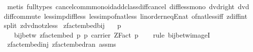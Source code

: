 \begin{isabellebody}
\ {\isacharparenleft}{\kern0pt}metis\ {\isacharparenleft}{\kern0pt}full{\isacharunderscore}{\kern0pt}types{\isacharparenright}{\kern0pt}\ cancel{\isacharunderscore}{\kern0pt}comm{\isacharunderscore}{\kern0pt}monoid{\isacharunderscore}{\kern0pt}add{\isacharunderscore}{\kern0pt}class{\isachardot}{\kern0pt}diff{\isacharunderscore}{\kern0pt}cancel\ diff{\isacharunderscore}{\kern0pt}less{\isacharunderscore}{\kern0pt}mono{}\ dvd{\isacharunderscore}{\kern0pt}{}{\isacharunderscore}{\kern0pt}right\ dvd{\isacharunderscore}{\kern0pt}diff{\isacharunderscore}{\kern0pt}commute\ less{\isacharunderscore}{\kern0pt}imp{\isacharunderscore}{\kern0pt}diff{\isacharunderscore}{\kern0pt}less\ less{\isacharunderscore}{\kern0pt}imp{\isacharunderscore}{\kern0pt}of{\isacharunderscore}{\kern0pt}nat{\isacharunderscore}{\kern0pt}less\ linorder{\isacharunderscore}{\kern0pt}neqE{\isacharunderscore}{\kern0pt}nat\ of{\isacharunderscore}{\kern0pt}nat{\isacharunderscore}{\kern0pt}{}{\isacharunderscore}{\kern0pt}less{\isacharunderscore}{\kern0pt}iff\ zdiff{\isacharunderscore}{\kern0pt}int{\isacharunderscore}{\kern0pt}split\ zdvd{\isacharunderscore}{\kern0pt}not{\isacharunderscore}{\kern0pt}zless{\isacharparenright}{\kern0pt}\isanewline
{}\isamarkupfalse%
%
\endisatagproof
{\isafoldproof}%
%
\isadelimproof
\isanewline
%
\endisadelimproof
\isanewline
{}\isamarkupfalse%
\ zfact{\isacharunderscore}{\kern0pt}embed{\isacharunderscore}{\kern0pt}bij{\isacharcolon}{\kern0pt}\isanewline
\ \ \ {\isachardoublequoteopen}p\ {\isachargreater}{\kern0pt}\ {}{\isachardoublequoteclose}\isanewline
\ \ \ {\isachardoublequoteopen}bij{\isacharunderscore}{\kern0pt}betw\ {\isacharparenleft}{\kern0pt}zfact{\isacharunderscore}{\kern0pt}embed\ p{\isacharparenright}{\kern0pt}\ {\isacharbraceleft}{\kern0pt}{}{\isachardot}{\kern0pt}{\isachardot}{\kern0pt}{\isacharless}{\kern0pt}p{\isacharbraceright}{\kern0pt}\ {\isacharparenleft}{\kern0pt}carrier\ {\isacharparenleft}{\kern0pt}ZFact\ p{\isacharparenright}{\kern0pt}{\isacharparenright}{\kern0pt}{\isachardoublequoteclose}\isanewline
%
\isadelimproof
\ \ %
\endisadelimproof
%
\isatagproof
{}\isamarkupfalse%
\ {\isacharparenleft}{\kern0pt}rule\ bij{\isacharunderscore}{\kern0pt}betw{\isacharunderscore}{\kern0pt}imageI{\isacharparenright}{\kern0pt}\isanewline
\ \ \isamarkupfalse%
\ zfact{\isacharunderscore}{\kern0pt}embed{\isacharunderscore}{\kern0pt}inj\ zfact{\isacharunderscore}{\kern0pt}embed{\isacharunderscore}{\kern0pt}ran\ assms\ \isamarkupfalse%

\end{isabellebody}
